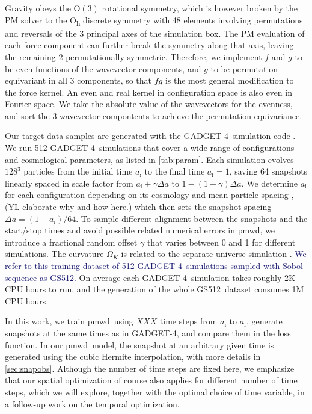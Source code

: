 \documentclass[modern, trackchanges, dvipsnames]{aastex631}
\newcommand{\pmwd}{{\usefont{T1}{nova}{m}{sl}pmwd}}
\newcommand{\GADGET}{{{\fontsize{10pt}{12pt}\selectfont GADGET}-4}}
\newcommand{\GSDATA}{{GS512}}
\newcommand{\OmegaK}{\Omega_K}
\newcommand{\ic}{\mathrm{i}}
\newcommand{\f}{\mathrm{f}}
\newcommand{\YL}[1]{\textcolor{Bittersweet}{#1}}
\newcommand{\YZ}[1]{\textcolor{MidnightBlue}{#1}}
\begin{document}
Gravity obeys the $\mathrm{O}(3)$ rotational symmetry, which is however
broken by the PM solver to the O\textsubscript{h} discrete symmetry with
48 elements involving permutations and reversals of the 3 principal axes
of the simulation box.
The PM evaluation of each force component can further break the symmetry
along that axis, leaving the remaining 2 permutationally symmetric.
Therefore, we implement $f$ and $g$ to be even functions of the
wavevector components, and $g$ to be permutation equivariant in all 3
components, so that $f g$ is the most general modification to the force
kernel.
An even and real kernel in configuration space is also even in Fourier
space.
We take the absolute value of the wavevectors for the evenness, and sort
the 3 wavevector compontents to achieve the permutation equivariance.

Our target data samples are generated with the \GADGET\ simulation code
\citep{GADGET-4}.
We run 512 \GADGET\ simulations that cover a wide range of
configurations and cosmological parameters, as listed in
\autoref{tab:param}.
\YL{
Each simulation evolves $128^3$ particles from the initial time $a_\ic$
to the final time $a_\f=1$, saving 64 snapshots linearly spaced in scale
factor from $a_\ic + \gamma \Delta a$ to $1 - (1 - \gamma) \Delta a$.
We determine $a_\ic$ for each configuration depending on its cosmology
and mean particle spacing \citep{MichauxEtAl2021}, \YL{(YL elaborate why
and how here.)} which then sets the snapshot spacing $\Delta a = (1 -
a_\ic) / 64$.
To sample different alignment between the snapshots and the start/stop
times and avoid possible related numerical errors in \pmwd, we introduce
a fractional random offset $\gamma$ that varies between 0 and 1 for
different simulations.
}
The curvature $\OmegaK$ is related to the separate universe simulation
\citep{LiEtAl2014, WagnerEtAl2015}.
\YZ{We refer to this training dataset of 512 \GADGET\ simulations
sampled with Sobol sequence as \GSDATA.}
On average each \GADGET\ simulation takes roughly 2K CPU hours to run,
and the generation of the whole \GSDATA\ dataset consumes 1M CPU hours.

\YL{
In this work, we train \pmwd\ using $XXX$ time steps from $a_\ic$ to
$a_\f$, generate snapshots at the same times as in \GADGET, and compare
them in the loss function.}
In our \pmwd\ model, the snapshot at an arbitrary given time is
generated using the cubic Hermite interpolation, with more details in
\autoref{sec:snapobs}.
\YL{Although the number of time steps are fixed here, we emphasize that
our spatial optimization of course also applies for different number of
time steps, which we will explore, together with the optimal choice of
time variable, in a follow-up work on the temporal optimization.
}
\end{document}
